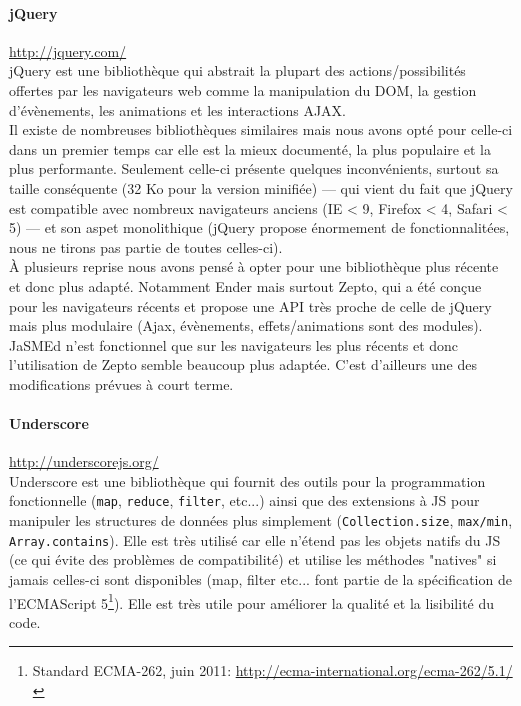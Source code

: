 \documentclass[12pt,a4paper]{article}
\begin{document}
\paragraph{jQuery}\url{http://jquery.com/}\\
jQuery est une bibliothèque qui abstrait la plupart des actions/possibilités offertes par les navigateurs web comme la manipulation du DOM, la gestion d’évènements, les animations et les interactions AJAX.\\
Il existe de nombreuses bibliothèques similaires mais nous avons opté pour celle-ci dans un premier temps car elle est la mieux documenté, la plus populaire et la plus performante. Seulement celle-ci présente quelques inconvénients, surtout sa taille conséquente (32 Ko pour la version minifiée) — qui vient du fait que jQuery est compatible avec nombreux navigateurs anciens (IE < 9, Firefox < 4, Safari < 5) — et son aspet monolithique (jQuery propose énormement de fonctionnalitées, nous ne tirons pas partie de toutes celles-ci).\\
À plusieurs reprise nous avons pensé à opter pour une bibliothèque plus récente et donc plus adapté. Notamment Ender mais surtout Zepto, qui a été conçue pour les navigateurs récents et propose une API très proche de celle de jQuery mais plus modulaire (Ajax, évènements, effets/animations sont des modules).\\
JaSMEd n’est fonctionnel que sur les navigateurs les plus récents et donc l’utilisation de Zepto semble beaucoup plus adaptée. C’est d'ailleurs une des modifications prévues à court terme.

\paragraph{Underscore}\url{http://underscorejs.org/}\\
Underscore est une bibliothèque qui fournit des outils pour la programmation fonctionnelle (\texttt{map}, \texttt{reduce}, \texttt{filter}, etc...) ainsi que des extensions à JS pour manipuler les structures de données plus simplement (\texttt{Collection.size}, \texttt{max/min}, \texttt{Array.contains}). Elle est très utilisé car elle n’étend pas les objets natifs du JS (ce qui évite des problèmes de compatibilité) et utilise les méthodes "natives" si jamais celles-ci sont disponibles (map, filter etc... font partie de la spécification de l’ECMAScript 5\footnote{Standard ECMA-262, juin 2011: \url{http://ecma-international.org/ecma-262/5.1/}}). Elle est très utile pour améliorer la qualité et la lisibilité du code.
\end{document}
